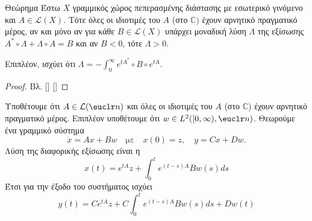 \begin{namedthrm}{Θεώρημα }
    Έστω $X$ γραμμικός χώρος πεπερασμένης διάστασης με εσωτερικό γινόμενο και 
    $A \in \mathcal{L}(X)$. Τότε όλες οι ιδιοτιμές του $A$ (στο 
    $\mathbb{C})$ έχουν αρνητικό πραγματικό μέρος, αν και μόνο αν για κάθε $B 
    \in \mathcal{L}(X)$ υπάρχει μοναδική λύση $\Lambda$ της εξίσωσης
    $A^{*} \circ \Lambda + \Lambda \circ A = B$ και αν $B < 0$, τότε $ \Lambda 
    > 0$.

    Επιπλέον, ισχύει ότι $\Lambda= -\int_{0}^{\infty} e^{t A^{*}} \circ 
    B \circ 
    e^{t A}$.
\end{namedthrm}
\begin{proof}
    Βλ. [] []
\end{proof}
Υποθέτουμε ότι $A \in \mathcal{L}(\euclr n)$ και όλες οι ιδιοτιμές του $A$ (στο
$\mathbb{C}$) έχουν αρνητικό πραγματικό μέρος. Επιπλέον υποθέτουμε ότι $w \in 
L^2([0, \infty), \euclr n)$. Θεωρούμε ένα γραμμικό σύστημα 
\begin{equation}
    \dot{x} = Ax + Bw \quad \text{με} \quad x(0) = z, \quad y = Cx + Dw.
    \label{ctl:lin}    
\end{equation}
Λύση της διαφορικής εξίσωσης είναι η
\[x(t) = e^{tA}z + \int_{0}^t e^{(t - s)A} B w(s) ds\]
Έτσι για την έξοδο του συστήματος ισχύει 
\begin{equation}
    y(t) = Ce^{tA}z + C\int_{0}^t e^{(t - s)A} B w(s) ds + Dw(t)
    \label{ctl:out}    
\end{equation} 

